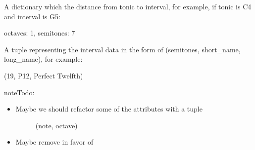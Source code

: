 \documentclass[letterpaper,10pt,english]{sphinxmanual}
\begin{document}
\begin{fulllineitems}
\begin{fulllineitems}
\end{fulllineitems}


\begin{fulllineitems}
\label{\detokenize{index:birdears.interval.ChromaticInterval.distance}}
 \textendash{} A dictionary which the distance from tonic to
interval, for example, if tonic is C4 and interval is G5:

\begin{sphinxVerbatim}[commandchars=\\\{\}]
\PYGZob{}
    \PYGZsq{}octaves\PYGZsq{}: 1,
    \PYGZsq{}semitones\PYGZsq{}: 7
\PYGZcb{}
\end{sphinxVerbatim}

\end{fulllineitems}


\begin{fulllineitems}
\label{\detokenize{index:birdears.interval.ChromaticInterval.data}}
 \textendash{} A tuple representing the interval data in the form of
(semitones, short\_name, long\_name), for example:

\begin{sphinxVerbatim}[commandchars=\\\{\}]
(19, \PYGZsq{}P12\PYGZsq{}, \PYGZsq{}Perfect Twelfth\PYGZsq{})
\end{sphinxVerbatim}

\end{fulllineitems}


\begin{sphinxadmonition}{note}{\label{index:index-0}Todo:}\begin{itemize}
\item {} \begin{description}
\item[{Maybe we should refactor some of the attributes with a tuple}] \leavevmode
(note, octave)

\end{description}

\item {} 
Maybe remove  in favor of 

\end{itemize}
\end{sphinxadmonition}


\end{fulllineitems}
\end{document}
